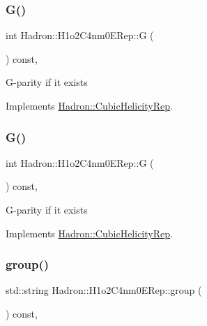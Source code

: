 \subsubsection{\texorpdfstring{G()}{G()}\hspace{0.1cm}{\footnotesize\ttfamily [2/3]}}
{\footnotesize\ttfamily int Hadron\+::\+H1o2\+C4nm0\+E\+Rep\+::G (\begin{DoxyParamCaption}{ }\end{DoxyParamCaption}) const\hspace{0.3cm}{\ttfamily [inline]}, {\ttfamily [virtual]}}

G-\/parity if it exists 

Implements \mbox{\hyperlink{structHadron_1_1CubicHelicityRep_a50689f42be1e6170aa8cf6ad0597018b}{Hadron\+::\+Cubic\+Helicity\+Rep}}.

\mbox{\label{structHadron_1_1H1o2C4nm0ERep_a27d3efda696f16d6a2aa6ed3c3a9daf9}} 
\subsubsection{\texorpdfstring{G()}{G()}\hspace{0.1cm}{\footnotesize\ttfamily [3/3]}}
{\footnotesize\ttfamily int Hadron\+::\+H1o2\+C4nm0\+E\+Rep\+::G (\begin{DoxyParamCaption}{ }\end{DoxyParamCaption}) const\hspace{0.3cm}{\ttfamily [inline]}, {\ttfamily [virtual]}}

G-\/parity if it exists 

Implements \mbox{\hyperlink{structHadron_1_1CubicHelicityRep_a50689f42be1e6170aa8cf6ad0597018b}{Hadron\+::\+Cubic\+Helicity\+Rep}}.

\mbox{\label{structHadron_1_1H1o2C4nm0ERep_a36a640810282f46b74dffd59f917c4cd}} 
\subsubsection{\texorpdfstring{group()}{group()}\hspace{0.1cm}{\footnotesize\ttfamily [1/3]}}
{\footnotesize\ttfamily std\+::string Hadron\+::\+H1o2\+C4nm0\+E\+Rep\+::group (\begin{DoxyParamCaption}{ }\end{DoxyParamCaption}) const\hspace{0.3cm}{\ttfamily [inline]}, {\ttfamily [virtual]}}

